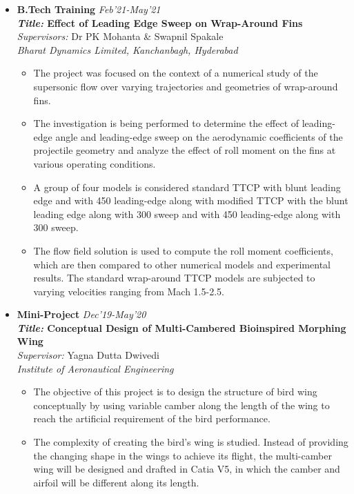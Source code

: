 \documentclass[10pt,article]{article}
\begin{document}
\begin{itemize}
\item \textbf{B.Tech Training} \hfill \textit{Feb'21-May'21}\\
\textbf{\textit{Title:} Effect of Leading Edge Sweep on Wrap-Around Fins}\\
\textit{Supervisors:} Dr PK Mohanta \& Swapnil Spakale \\
\textit{Bharat Dynamics Limited, Kanchanbagh, Hyderabad}
\vspace{-2mm}
\begin{itemize}
    \item The project was focused on the context of a numerical study of the supersonic flow over varying trajectories and geometries of wrap-around fins. 
    \item The investigation is being performed to determine the effect of leading-edge angle and leading-edge sweep on the aerodynamic coefficients of the projectile geometry and analyze the effect of roll moment on the fins at various operating conditions. 
    \item A group of four models is considered standard TTCP with blunt leading edge and with 450 leading-edge along with modified TTCP with the blunt leading edge along with 300 sweep and with 450 leading-edge along with 300 sweep.
    \item The flow field solution is used to compute the roll moment coefficients, which are then compared to other numerical models and experimental results. The standard wrap-around TTCP models are subjected to varying velocities ranging from Mach 1.5-2.5.
\end{itemize}

\item \textbf{Mini-Project} \hfill \textit{Dec'19-May'20}\\
\textbf{\textit{Title:} Conceptual Design of Multi-Cambered Bioinspired Morphing Wing}\\
\textit{Supervisor:} Yagna Dutta Dwivedi \\
\textit{Institute of Aeronautical Engineering}
\vspace{-2mm}
\begin{itemize}
    \item The objective of this project is to design the structure of bird wing conceptually by using variable camber along the length of the wing to reach the artificial requirement of the bird performance.
    \item The complexity of creating the bird's wing is studied. Instead of providing the changing shape in the wings to achieve its flight, the multi-camber wing will be designed and drafted in Catia V5, in which the camber and airfoil will be different along its length.
\end{itemize}
\end{itemize}
\end{document}
